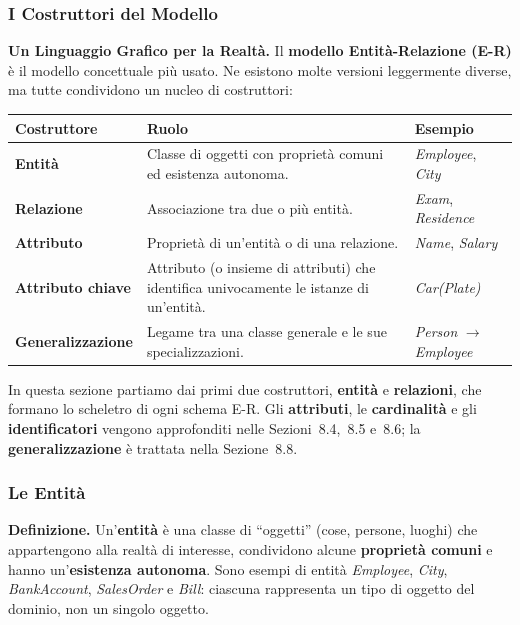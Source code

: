 \documentclass[12pt]{extarticle}
\begin{document}
\subsubsection{I Costruttori del Modello}

\noindent \textbf{Un Linguaggio Grafico per la Realtà.} Il \textbf{modello Entità-Relazione (E-R)} è il modello concettuale più usato. Ne esistono molte versioni leggermente diverse, ma tutte condividono un nucleo di costruttori:

\begin{center}
\small
\begin{tabular}{@{}L{3.6cm}L{7.4cm}L{4.4cm}@{}}
    \toprule
    \textbf{Costruttore} & \textbf{Ruolo} & \textbf{Esempio} \\
    \midrule
    \textbf{Entità} & Classe di oggetti con proprietà comuni ed esistenza autonoma. & \textit{Employee}, \textit{City} \\
    \addlinespace
    \textbf{Relazione} & Associazione tra due o più entità. & \textit{Exam}, \textit{Residence} \\
    \addlinespace
    \textbf{Attributo} & Proprietà di un'entità o di una relazione. & \textit{Name}, \textit{Salary} \\
    \addlinespace
    \textbf{Attributo chiave} & Attributo (o insieme di attributi) che identifica univocamente le istanze di un'entità. & \textit{Car(Plate)} \\
    \addlinespace
    \textbf{Generalizzazione} & Legame tra una classe generale e le sue specializzazioni. & \textit{Person} $\to$ \textit{Employee} \\
    \bottomrule
\end{tabular}
\end{center}

\medskip
\noindent In questa sezione partiamo dai primi due costruttori, \textbf{entità} e \textbf{relazioni}, che formano lo scheletro di ogni schema E-R. Gli \textbf{attributi}, le \textbf{cardinalità} e gli \textbf{identificatori} vengono approfonditi nelle Sezioni~8.4,~8.5 e~8.6; la \textbf{generalizzazione} è trattata nella Sezione~8.8.

\subsubsection{Le Entità}

\noindent \textbf{Definizione.} Un'\textbf{entità} è una classe di ``oggetti'' (cose, persone, luoghi) che appartengono alla realtà di interesse, condividono alcune \textbf{proprietà comuni} e hanno un'\textbf{esistenza autonoma}. Sono esempi di entità \textit{Employee}, \textit{City}, \textit{BankAccount}, \textit{SalesOrder} e \textit{Bill}: ciascuna rappresenta un tipo di oggetto del dominio, non un singolo oggetto.
\end{document}
